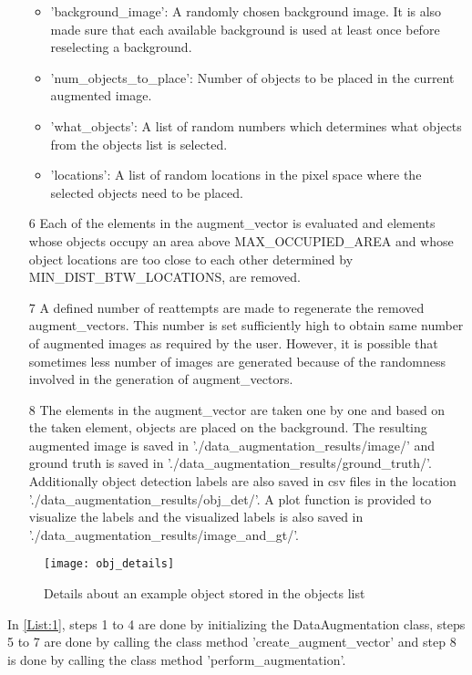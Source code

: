 \documentclass[paper=a4,11pt,parskip=half,toc=listof]{scrartcl}
\begin{document}
\begin{itemize}
			\begin{itemize}
				\item 'background\_image': A randomly chosen background image. It is also made sure that each available background is used at least once before reselecting a background.
				\item 'num\_objects\_to\_place': Number of objects to be placed in the current augmented image.
				\item 'what\_objects': A list of random numbers which determines what objects from the objects list is selected.
				\item 'locations': A list of random locations in the pixel space where the selected objects need to be placed.
			\end{itemize}
		\item[6] Each of the elements in the augment\_vector is evaluated and elements whose objects occupy an area above MAX\_OCCUPIED\_AREA and whose object locations are too close to each other determined by MIN\_DIST\_BTW\_LOCATIONS, are removed.
		\item[7] A defined number of reattempts are made to regenerate the removed augment\_vectors. This number is set sufficiently high to obtain same number of augmented images as required by the user. However, it is possible that sometimes less number of images are generated because of the randomness involved in the generation of augment\_vectors.
		\item[8] The elements in the augment\_vector are taken one by one and based on the taken element, objects are placed on the background. The resulting augmented image is saved in './data\_augmentation\_results/image/' and ground truth is saved in './data\_augmentation\_results/ground\_truth/'. Additionally object detection labels are also saved in csv files in the location './data\_augmentation\_results/obj\_det/'. A plot function is provided to visualize the labels and the visualized labels is also saved in './data\_augmentation\_results/image\_and\_gt/'.
	\end{itemize}
	
	\begin{figure}[htb!]
		\centering
		\texttt{[image: obj\_details]}
		\caption{Details about an example object stored in the objects list}
		\label{Fig:7}
	\end{figure}
	
In \ref{List:1}, steps 1 to 4 are done by initializing the DataAugmentation class, steps 5 to 7 are done by calling the class method 'create\_augment\_vector' and step 8 is done by calling the class method 'perform\_augmentation'.
	
\end{document}
